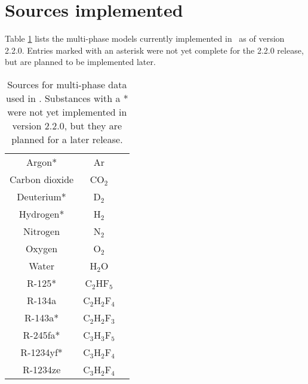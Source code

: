 \section{Sources implemented}
Table \ref{tab:mp:source} lists the multi-phase models currently implemented in \PM\ as of version 2.2.0.  Entries marked with an asterisk were not yet complete for the 2.2.0 release, but are planned to be implemented later.

\begin{table}
\centering
\caption{Sources for multi-phase data used in \PM.  Substances with a * were not yet implemented in version 2.2.0, but they are planned for a later release.}\label{tab:mp:source}
\begin{tabular}{|ccc|}
\hline
Argon* & Ar & \cite{tegeler:1999}\\
Carbon dioxide & CO$_2$ & \cite{span:1994}\\
Deuterium* & D$_2$ & \cite{richardson:2013}\\
Hydrogen* & H$_2$ & \cite{leachman:2009}\\
Nitrogen & N$_2$ & \cite{span:2000}\\
Oxygen & O$_2$ & \cite{stewart:1991}\\
Water & H$_2$O & \cite{iapws:2014}\\
R-125* & C$_2$HF$_5$ & \cite{piao:1998}\\
R-134a & C$_2$H$_2$F$_4$ & \cite{tilner:1994}\\
R-143a* & C$_2$H$_2$F$_3$ & \cite{lemmon:2000}\\
R-245fa* & C$_3$H$_3$F$_5$ & \cite{akasaka:2015}\\
R-1234yf* & C$_3$H$_2$F$_4$ & \cite{richter:2011}\\
R-1234ze & C$_3$H$_2$F$_4$ & \cite{thol:2016}\\
\hline
\end{tabular}
\end{table}
